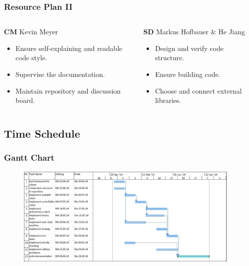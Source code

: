 \documentclass[hyperref={pdfpagelabels=false},compress]{beamer}
\begin{document}
\begin{frame}
	\frametitle{Resource Plan II}
	\begin{columns}[t]
		\begin{column}{0.50\textwidth}
			\begin{block}{\textbf{CM} Kevin Meyer}
				\begin{itemize}
					\item Ensure self-explaining and readable code style.
					\item Supervise the documentation.
					\item Maintain repository and discussion board.
				\end{itemize}
			\end{block}
		\end{column}

		\begin{column}{0.50\textwidth}
			\begin{block}{\textbf{SD} Markus Hofbauer \& He Jiang}
				\begin{itemize}
					\item Design and verify code structure.
					\item Ensure building code.
					\item Choose and connect external libraries.
				\end{itemize}
			\end{block}
		\end{column}
	\end{columns}
\end{frame}

\subsection{Time Schedule}
\begin{frame}
	\frametitle{Gantt Chart}
	\begin{figure}
		\centering
		\includegraphics[width = 0.98\textwidth]{gantt_alt.jpg}
	\end{figure}
\end{frame}
\end{document}

